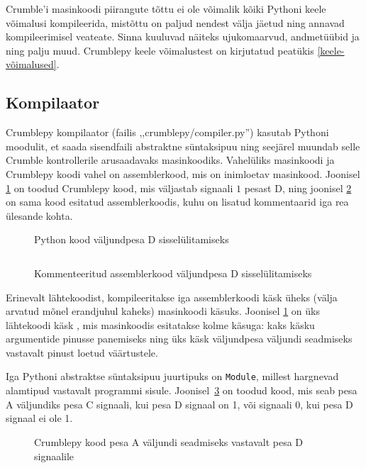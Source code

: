 \documentclass[12pt]{article}
\begin{document}
Crumble'i masinkoodi piirangute tõttu ei ole võimalik kõiki Pythoni keele võimalusi kompileerida, mistõttu on paljud nendest välja jäetud ning annavad kompileerimisel veateate. Sinna kuuluvad näiteks ujukomaarvud, andmetüübid  ja  ning palju muud. Crumblepy keele võimalustest on kirjutatud peatükis \ref{keele-võimalused}.

\subsection{Kompilaator}

Crumblepy kompilaator (failis ,,crumblepy/compiler.py'') kasutab Pythoni  moodulit, et saada sisendfaili abstraktne süntaksipuu ning seejärel muundab selle Crumble kontrollerile arusaadavaks masinkoodiks. Vahelüliks masinkoodi ja Crumblepy koodi vahel on assemblerkood, mis on inimloetav masinkood. Joonisel \ref{denable} on toodud Crumblepy kood, mis väljastab signaali $1$ pesast D, ning joonisel \ref{denable-assembly} on sama kood esitatud assemblerkoodis, kuhu on lisatud kommentaarid iga rea ülesande kohta.

\begin{figure}[ht]
	\caption{Python kood väljundpesa D sisselülitamiseks}
	\label{denable}
\end{figure}

\begin{figure}[ht]
	\inputminted{text}{d-enable-asm.crpy}
	\caption{Kommenteeritud assemblerkood väljundpesa D sisselülitamiseks}
	\label{denable-assembly}
\end{figure}

Erinevalt lähtekoodist, kompileeritakse iga assemblerkoodi käsk üheks (välja arvatud mõnel erandjuhul kaheks) masinkoodi käsuks. Joonisel \ref{denable} on üks lähtekoodi käsk , mis masinkoodis esitatakse kolme käsuga: kaks käsku argumentide pinusse panemiseks ning üks käsk väljundpesa väljundi seadmiseks vastavalt pinust loetud väärtustele.

Iga Pythoni abstraktse süntaksipuu juurtipuks on \texttt{Module}, millest hargnevad alamtipud vastavalt programmi sisule. Joonisel~\ref{ast-code} on toodud kood, mis seab pesa A väljundiks pesa C signaali, kui pesa D signaal on 1, või signaali 0, kui pesa D signaal ei ole 1.

\begin{figure}[ht]
	\caption{Crumblepy kood pesa A väljundi seadmiseks vastavalt pesa D signaalile}
	\label{ast-code}
\end{figure}
\end{document}
